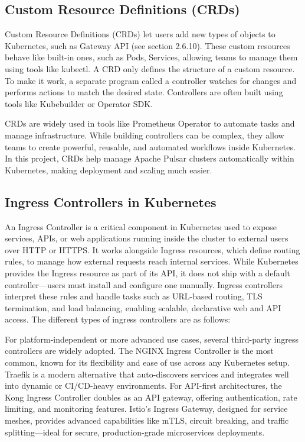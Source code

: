 \subsection{Custom Resource Definitions (CRDs)}
Custom Resource Definitions (CRDs) let users add new types of objects to Kubernetes, such as Gateway API (see section 2.6.10). These custom resources behave like built-in ones, such as Pods, Services, allowing teams to manage them using tools like kubectl. A CRD only defines the structure of a custom resource. To make it work, a separate program called a controller watches for changes and performs actions to match the desired state. Controllers are often built using tools like Kubebuilder or Operator SDK.

CRDs are widely used in tools like Prometheus Operator to automate tasks and manage infrastructure. While building controllers can be complex, they allow teams to create powerful, reusable, and automated workflows inside Kubernetes. In this project, CRDs help manage Apache Pulsar clusters automatically within Kubernetes, making deployment and scaling much easier.

\subsection{Ingress Controllers in Kubernetes}
An Ingress Controller is a critical component in Kubernetes used to expose services, APIs, or web applications running inside the cluster to external users over HTTP or HTTPS. It works alongside Ingress resources, which define routing rules, to manage how external requests reach internal services. While Kubernetes provides the Ingress resource as part of its API, it does not ship with a default controller—users must install and configure one manually. Ingress controllers interpret these rules and handle tasks such as URL-based routing, TLS termination, and load balancing, enabling scalable, declarative web and API access. The different types of ingress controllers are as follows:



For platform-independent or more advanced use cases, several third-party ingress controllers are widely adopted. The NGINX Ingress Controller is the most common, known for its flexibility and ease of use across any Kubernetes setup. Traefik is a modern alternative that auto-discovers services and integrates well into dynamic or CI/CD-heavy environments. For API-first architectures, the Kong Ingress Controller doubles as an API gateway, offering authentication, rate limiting, and monitoring features. Istio's Ingress Gateway, designed for service meshes, provides advanced capabilities like mTLS, circuit breaking, and traffic splitting—ideal for secure, production-grade microservices deployments.

